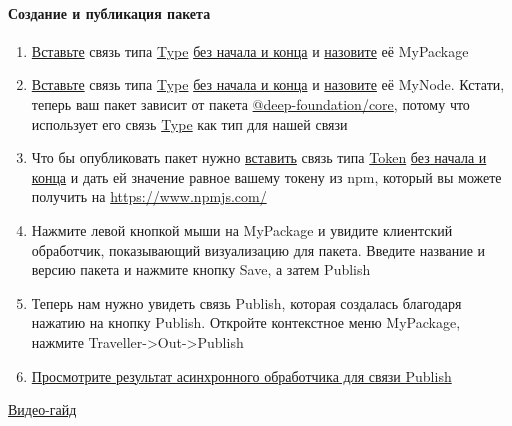 \paragraph{Создание и публикация пакета}
\begin{enumerate}
      \item \hyperlink{DeepCase.InsertLink.Description}{Вставьте} связь типа
            \hyperlink{Core.Package.Description}{Type}
            \hyperlink{FAQ.HowToInsertLinkWithoutFromAndTo}{без начала и конца}
            и
            \hyperlink{FAQ.HowToSetName}{назовите} её MyPackage
      \item \hyperlink{DeepCase.InsertLink.Description}{Вставьте} связь типа
            \hyperlink{Core.Package.Description}{Type}
            \hyperlink{FAQ.HowToInsertLinkWithoutFromAndTo}{без начала и конца}
            и
            \hyperlink{FAQ.HowToSetName}{назовите} её MyNode. Кстати, теперь
            ваш
            пакет
            зависит от пакета
            \hyperlink{Core.Description}{@deep-foundation/core},
            потому что
            использует его связь \hyperlink{Core.Type.Description}{Type} как
            тип
            для нашей связи
      \item Что бы опубликовать пакет нужно
            \hyperlink{DeepCase.InsertLink.Description}{вставить} связь типа
            \hyperlink{NpmPackager.Token.Description}{Token}
            \hyperlink{FAQ.HowToInsertLinkWithoutFromAndTo}{без начала и конца}
            и
            дать ей
            значение равное вашему токену из npm, который вы можете получить на
            \url{https://www.npmjs.com/}
      \item Нажмите левой кнопкой мыши на MyPackage и увидите клиентский
            обработчик, показывающий визуализацию для пакета. Введите название
            и
            версию
            пакета и нажмите кнопку Save, а затем Publish
      \item Теперь нам нужно увидеть связь Publish, которая создалась благодаря
            нажатию на кнопку Publish. Откройте контекстное меню MyPackage,
            нажмите
            Traveller->Out->Publish
      \item \hyperlink{Handlers.Async.HowToGetResult}{Просмотрите результат
                  асинхронного обработчика для связи Publish}
\end{enumerate}
\href{https://youtu.be/k6dKOrwDMco}{Видео-гайд}

